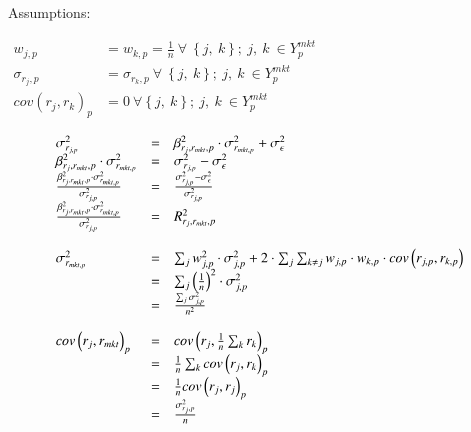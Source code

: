 \documentclass[]{elsarticle} %
\begin{document}
Assumptions:

\begin{math}
  \begin{aligned}
   w_{j, p} &= w_{k, p} = \frac{1}{n} \: \forall \: \left \{ j, \: k \right \}; \: j, \: k \: \in Y_{p}^{mkt} \\
   \sigma_{r_{j}, p} &= \sigma_{r_{k}, p} \: \forall \: \left \{ j, \: k \right \}; \: j, \: k \: \in Y_{p}^{mkt} \\
   cov \left ( r_{j}, r_{k} \right )_{p} &= 0 \: \forall \left \{ j, \: k \right \}; \: j, \: k \: \in Y_{p}^{mkt}
  \end{aligned}
\end{math}

\newpage

\[
\begin{array}{l c l}
  \sigma_{r_{j, p}}^{2} & = & \beta_{r_{j}, r_{mkt}, p}^{2} \cdot \sigma_{r_{mkt, p}}^{2} + \sigma_{\epsilon}^{2} \\
  \beta_{r_{j}, r_{mkt}, p}^{2} \cdot \sigma_{r_{mkt, p}}^{2} & = & \sigma_{r_{j, p}}^{2} - \sigma_{\epsilon}^{2} \\
  \frac{\beta_{r_{j}, r_{mkt}, p}^{2} \cdot \sigma_{r_{mkt, p}}^{2}}{\sigma_{r_{j, p}}^{2}} & = & \frac{\sigma_{r_{j, p}}^{2} - \sigma_{\epsilon}^{2}}{\sigma_{r_{j, p}}^{2}} \\
    \frac{\beta_{r_{j}, r_{mkt}, p}^{2} \cdot \sigma_{r_{mkt, p}}^{2}}{\sigma_{r_{j, p}}^{2}}  & = & R_{r_{j}, r_{mkt}, p}^{2} \\ \\
  \sigma_{r_{mkt, p}}^{2} & = & \sum_{j} w_{j, p}^{2} \cdot \sigma_{j, p}^{2} + 2 \cdot \sum_{j} \sum_{k \neq j} w_{j, p} \cdot w_{k, p} \cdot cov \left ( r_{j, p}, r_{k, p} \right ) \\
                          & = & \sum_{j} \left ( \frac{1}{n} \right )^{2} \cdot \sigma_{j, p}^{2} \\
                          & = & \frac{\sum_{j} \sigma_{j, p}^{2}}{n^{2}} \\ \\
  cov \left ( r_{j}, r_{mkt} \right )_{p} & = & cov \left ( r_{j}, \frac{1}{n} \sum_{k} r_{k} \right )_{p} \\
                                          & = & \frac{1}{n} \sum_{k} cov \left ( r_{j}, r_{k} \right )_{p} \\
                                          & = & \frac{1}{n} cov \left ( r_{j}, r_{j} \right )_{p} \\
                                          & = & \frac{\sigma_{r_{j}, p}^{2}}{n} \\ \\

\end{array}\]
\end{document}
